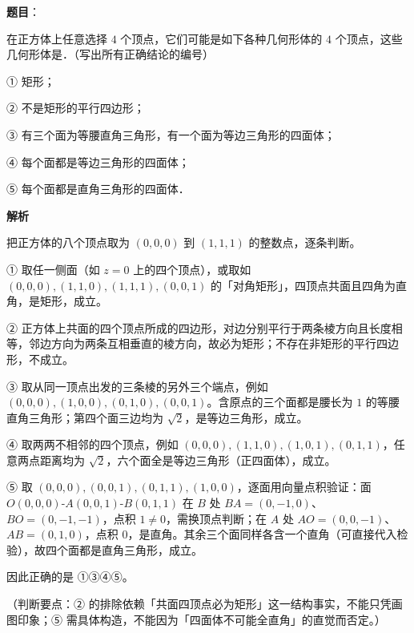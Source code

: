 \begin{answer}

\textbf{题目}：

在正方体上任意选择 $4$ 个顶点，它们可能是如下各种几何形体的 $4$ 个顶点，这些几何形体是\gkblank{}．（写出所有正确结论的编号）

① 矩形；

② 不是矩形的平行四边形；

③ 有三个面为等腰直角三角形，有一个面为等边三角形的四面体；

④ 每个面都是等边三角形的四面体；

⑤ 每个面都是直角三角形的四面体．

\textbf{解析}

把正方体的八个顶点取为 $(0,0,0)$ 到 $(1,1,1)$ 的整数点，逐条判断。

① 取任一侧面（如 $z=0$ 上的四个顶点），或取如 $(0,0,0),(1,1,0),(1,1,1),(0,0,1)$ 的「对角矩形」，四顶点共面且四角为直角，是矩形，成立。

② 正方体上共面的四个顶点所成的四边形，对边分别平行于两条棱方向且长度相等，邻边方向为两条互相垂直的棱方向，故必为矩形；不存在非矩形的平行四边形，不成立。

③ 取从同一顶点出发的三条棱的另外三个端点，例如 $(0,0,0),(1,0,0),(0,1,0),(0,0,1)$。含原点的三个面都是腰长为 $1$ 的等腰直角三角形；第四个面三边均为 $\sqrt2$，是等边三角形，成立。

④ 取两两不相邻的四个顶点，例如 $(0,0,0),(1,1,0),(1,0,1),(0,1,1)$，任意两点距离均为 $\sqrt2$，六个面全是等边三角形（正四面体），成立。

⑤ 取 $(0,0,0),(0,0,1),(0,1,1),(1,0,0)$，逐面用向量点积验证：面 $O(0,0,0)$-$A(0,0,1)$-$B(0,1,1)$ 在 $B$ 处 $BA=(0,-1,0)$、$BO=(0,-1,-1)$，点积 $1\neq0$，需换顶点判断；在 $A$ 处 $AO=(0,0,-1)$、$AB=(0,1,0)$，点积 $0$，是直角。其余三个面同样各含一个直角（可直接代入检验），故四个面都是直角三角形，成立。

因此正确的是 ①③④⑤。

（判断要点：② 的排除依赖「共面四顶点必为矩形」这一结构事实，不能只凭画图印象；⑤ 需具体构造，不能因为「四面体不可能全直角」的直觉而否定。）


\end{answer}
